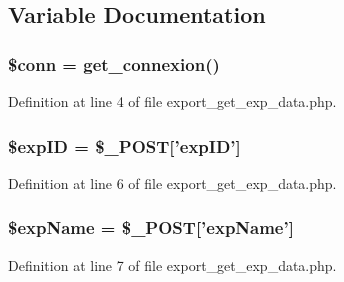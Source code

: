 \subsection{Variable Documentation}
\hypertarget{export__get__exp__data_8php_aa8a5a87b9c1a6a0819b88447cbe41877}{
\subsubsection[{\$conn}]{\setlength{\rightskip}{0pt plus 5cm}\$conn = {\bf get\-\_\-connexion}()}}\label{export__get__exp__data_8php_aa8a5a87b9c1a6a0819b88447cbe41877}


Definition at line 4 of file export\-\_\-get\-\_\-exp\-\_\-data.\-php.

\hypertarget{export__get__exp__data_8php_ae384d32e62e85e587cd27bf249ed3db3}{
\subsubsection[{\$exp\-I\-D}]{\setlength{\rightskip}{0pt plus 5cm}\${\bf exp\-I\-D} = \$\-\_\-\-P\-O\-S\-T\mbox{[}'{\bf exp\-I\-D}'\mbox{]}}}\label{export__get__exp__data_8php_ae384d32e62e85e587cd27bf249ed3db3}


Definition at line 6 of file export\-\_\-get\-\_\-exp\-\_\-data.\-php.

\hypertarget{export__get__exp__data_8php_a6478e66386fefd0e5fd6de22d695ffca}{
\subsubsection[{\$exp\-Name}]{\setlength{\rightskip}{0pt plus 5cm}\$exp\-Name = \$\-\_\-\-P\-O\-S\-T\mbox{[}'exp\-Name'\mbox{]}}}\label{export__get__exp__data_8php_a6478e66386fefd0e5fd6de22d695ffca}


Definition at line 7 of file export\-\_\-get\-\_\-exp\-\_\-data.\-php.

